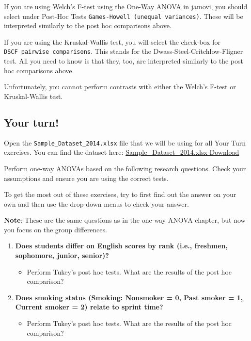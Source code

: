 \documentclass[
]{book}
\providecommand{\tightlist}{%
  \setlength{\itemsep}{0pt}\setlength{\parskip}{0pt}}
\begin{document}
If you are using Welch's F-test using the One-Way ANOVA in jamovi, you should select under Post-Hoc Tests \texttt{Games-Howell\ (unequal\ variances)}. These will be interpreted similarly to the post hoc comparisons above.

If you are using the Kruskal-Wallis test, you will select the check-box for \texttt{DSCF\ pairwise\ comparisons}. This stands for the Dwass-Steel-Critchlow-Fligner test. All you need to know is that they, too, are interpreted similarly to the post hoc comparisons above.

Unfortunately, you cannot perform contrasts with either the Welch's F-test or Kruskal-Wallis test.

\hypertarget{your-turn-6}{%
\subsection{Your turn!}\label{your-turn-6}}

Open the \texttt{Sample\_Dataset\_2014.xlsx} file that we will be using for all Your Turn exercises. You can find the dataset here: \href{https://github.com/danawanzer/stats-with-jamovi/blob/master/data/Sample_Dataset_2014.xlsx}{Sample\_Dataset\_2014.xlsx Download}

Perform one-way ANOVAs based on the following research questions. Check your assumptions and ensure you are using the correct tests.

To get the most out of these exercises, try to first find out the answer on your own and then use the drop-down menus to check your answer.

\textbf{Note}: These are the same questions as in the one-way ANOVA chapter, but now you focus on the group differences.

\begin{enumerate}
\def\labelenumi{\arabic{enumi}.}
\item
  \textbf{Does students differ on English scores by rank (i.e., freshmen, sophomore, junior, senior)?}

  \begin{itemize}
  \tightlist
  \item
    Perform Tukey's post hoc tests. What are the results of the post hoc comparison?
  \end{itemize}
\item
  \textbf{Does smoking status (Smoking: Nonsmoker = 0, Past smoker = 1, Current smoker = 2) relate to sprint time?}

  \begin{itemize}
  \tightlist
  \item
    Perform Tukey's post hoc tests. What are the results of the post hoc comparison?
  \end{itemize}
\end{enumerate}
\end{document}
